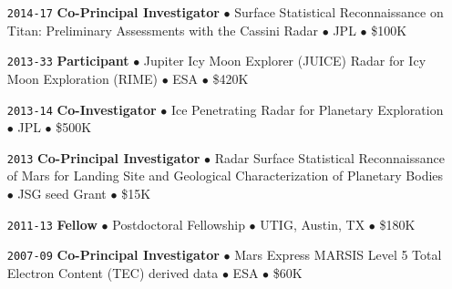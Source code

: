 \begin{itemize}[leftmargin=5.8em, labelsep=1.5em]
    \item[\texttt{2014-17}] \textbf{Co-Principal Investigator} $\bullet$ Surface Statistical Reconnaissance on Titan: Preliminary Assessments with the Cassini Radar $\bullet$ JPL $\bullet$ \$100K
    
    \item[\texttt{2013-33}] \textbf{Participant} $\bullet$ Jupiter Icy Moon  Explorer (JUICE) Radar for Icy Moon Exploration (RIME) $\bullet$ ESA $\bullet$ \$420K
    
    \item[\texttt{2013-14}] \textbf{Co-Investigator} $\bullet$ Ice Penetrating Radar for Planetary Exploration $\bullet$ JPL $\bullet$ \$500K
    
    \item[\texttt{2013}] \textbf{Co-Principal Investigator} $\bullet$ Radar Surface Statistical Reconnaissance of Mars for Landing Site and Geological Characterization of Planetary Bodies $\bullet$ JSG seed Grant $\bullet$ \$15K
    
    \item[\texttt{2011-13}] \textbf{Fellow} $\bullet$ Postdoctoral Fellowship $\bullet$ UTIG, Austin, TX $\bullet$ \$180K
    
    \item[\texttt{2007-09}] \textbf{Co-Principal Investigator} $\bullet$ Mars Express MARSIS Level 5 Total Electron Content (TEC) derived data $\bullet$ ESA $\bullet$ \$60K
\end{itemize}
